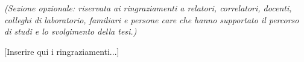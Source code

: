 \documentclass[12pt, a4paper, oneside]{book}
\begin{document}
\textit{(Sezione opzionale: riservata ai ringraziamenti a relatori, correlatori, docenti, colleghi di laboratorio, familiari e persone care che hanno supportato il percorso di studi e lo svolgimento della tesi.)}

[Inserire qui i ringraziamenti...]

\cleardoublepage

\tableofcontents
\newpage
\listoftables      %
\newpage
\listoffigures     %
\newpage
\lstlistoflistings %
\cleardoublepage

\mainmatter
\setcounter{chapter}{0} 




    



\backmatter

\printbibliography[heading=bibintoc, title={Bibliografia}]
\end{document}

